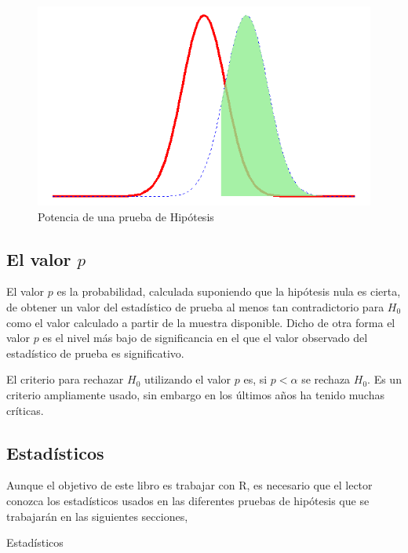 \documentclass[]{book}
\begin{document}
\begin{figure}[h]

{\centering \includegraphics[width=0.5\linewidth]{power} 

}

\caption{Potencia de una prueba de Hipótesis}\label{fig:power}
\end{figure}

\subsection{\texorpdfstring{El valor
\(p\)}{El valor p}}\label{el-valor-p}

El valor \(p\) es la probabilidad, calculada suponiendo que la hipótesis
nula es cierta, de obtener un valor del estadístico de prueba al menos
tan contradictorio para \(H_0\) como el valor calculado a partir de la
muestra disponible. Dicho de otra forma el valor \(p\) es el nivel más
bajo de significancia en el que el valor observado del estadístico de
prueba es significativo.

El criterio para rechazar \(H_0\) utilizando el valor \(p\) es, si
\(p<\alpha\) se rechaza \(H_0\). Es un criterio ampliamente usado, sin
embargo en los últimos años ha tenido muchas críticas.

\subsection{Estadísticos}\label{estadisticos}

Aunque el objetivo de este libro es trabajar con R, es necesario que el
lector conozca los estadísticos usados en las diferentes pruebas de
hipótesis que se trabajarán en las siguientes secciones,

\label{tab:estadisticos} Estadísticos
\end{document}
